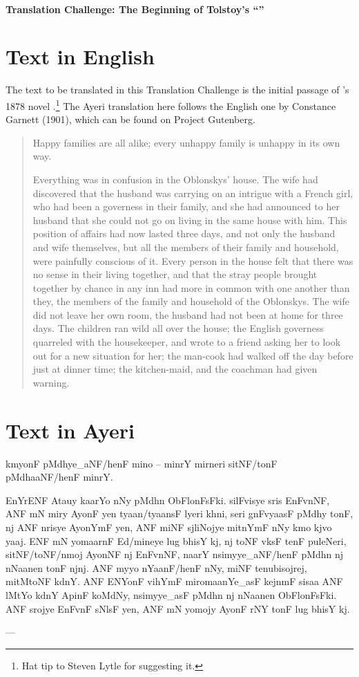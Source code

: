 \documentclass[12pt,paper=letter]{scrartcl}
\newcommand{\q}[1]{\enquote{#1}} %
\newenvironment{ayeri}{
    \doublespacing
    \begin{multicols}{2}
    \Tagati
}{
    \end{multicols} \par
}
\newenvironment{mytitle}{
    \begin{center}
	\Large
	\sffamily\bfseries
	~\\
}{
    \end{center}
}
\begin{document}

\begin{mytitle}
    Translation Challenge: The Beginning of Tolstoy's \q{}
\end{mytitle}

\section{Text in English}

The text to be translated in this Translation Challenge is the initial passage
of \citeauthor{tolstoy}'s 1878 novel .\footnote{Hat tip to 
Steven Lytle for suggesting it.} The Ayeri translation here follows the English 
one by Constance Garnett (1901), which can be found on Project Gutenberg.

\blockcquote{tolstoy}{
\noindent Happy families are all alike; every unhappy family is unhappy in its 
own way.

Everything was in confusion in the Oblonskys’ house. The wife had discovered 
that the husband was carrying on an intrigue with a French girl, who had been a 
governess in their family, and she had announced to her husband that she could 
not go on living in the same house with him. This position of affairs had now 
lasted three days, and not only the husband and wife themselves, but all the 
members of their family and household, were painfully conscious of it. Every 
person in the house felt that there was no sense in their living together, and 
that the stray people brought together by chance in any inn had more in common 
with one another than they, the members of the family and household of the 
Oblonskys. The wife did not leave her own room, the husband had not been at 
home for three days. The children ran wild all over the house; the English 
governess quarreled with the housekeeper, and wrote to a friend asking her to 
look out for a new situation for her; the man-cook had walked off the day 
before just at dinner time; the kitchen-maid, and the coachman had given warning.
}

\section{Text in Ayeri}
\begin{ayeri}
\noindent kmyonF pMdhye\_aNF/henF mino – minrY mirneri sitNF/tonF pMdhaaNF/henF minrY.

EnYrENF Atauy kaarYo nNy pMdhn ObFlonFsFki.
silF\-visye sris EnFvnNF, ANF mN miry AyonF yen tyaan/tyaansF lyeri khni, seri 
gnFvyaasF pMdhy tonF, nj ANF nrisye Ayo\-nYmF yen, ANF miNF sjliNojye mitnYmF 
nNy kmo kjvo yaaj. ENF mN yomaarnF Ed/mineye lug bhisY kj, nj toNF vksF tenF 
puleNeri, sitNF/toNF/nmoj AyonNF nj EnFvnNF, naarY nsimyye\_aNF/henF pMdhn nj 
nNaanen tonF njnj. 
ANF myyo nYaanF/henF nNy, miNF tenubisojrej, mitMtoNF kdnY.
ANF ENYonF vihYmF miromaanYe\_asF kejnmF sisaa ANF lMtYo kdnY ApinF koMdNy, nsimyye\_asF pMdhn nj nNaanen ObFlonFsFki.
ANF srojye EnFvnF sNlsF yen, ANF mN yomojy AyonF rNY tonF lug bhisY kj.

--- 
\end{ayeri}
\end{document}

